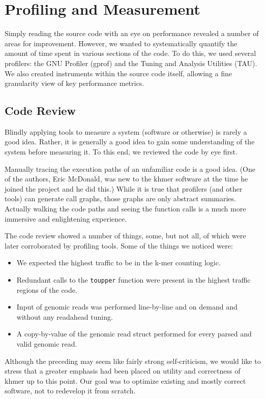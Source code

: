 \documentclass{article}
\begin{document}
\section{Profiling and Measurement}

Simply reading the source code with an eye on performance revealed a number of
areas for improvement. However, we wanted to systematically quantify the amount
of time spent in various sections of the code. To do this, we used several
profilers: the GNU Profiler (gprof) and the Tuning and Analysis Utilities
(TAU). We also created instruments within the source code itself, allowing a
fine granularity view of key performance metrics.

\subsection{Code Review}

Blindly applying tools to measure a system (software or otherwise) is rarely a
good idea. Rather, it is generally a good idea to gain some understanding of
the system before measuring it. To this end, we reviewed the code by eye first.

Manually tracing the execution paths of an unfamiliar code is a good idea.
(One of the authors, Eric McDonald, was new to the khmer software at the time
he joined the project and he did this.) While it is true that profilers (and
other tools) can generate call graphs, those graphs are only abstract
summaries. Actually walking the code paths and seeing the function calls is a
much more immersive and enlightening experience.

The code review showed a number of things, some, but not all, of which were
later corroborated by profiling tools. Some of the things we noticed were:

\begin{itemize}
\item We expected the highest traffic to be in the k-mer counting logic.
\item Redundant calls to the \texttt{toupper} function were present in the highest traffic 
regions of the code.
\item Input of genomic reads was performed line-by-line and on demand and without 
any readahead tuning.
\item A copy-by-value of the genomic read struct performed for every parsed and valid genomic read.
\end{itemize}

Although the preceding may seem like fairly strong self-criticism, we
would like to stress that a greater emphasis had been placed on
utility and correctness of khmer up to this point.  Our goal was to optimize
existing and mostly correct software, not to redevelop it from scratch.
\end{document}
